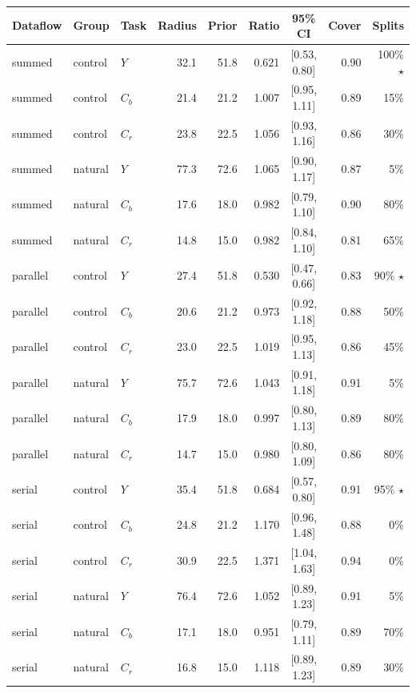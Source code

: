 \begin{tabular}{lllrrrcrr}
\hline
Dataflow & Group & Task & Radius & Prior & Ratio & 95\% CI & Cover & Splits \\
\hline
summed & control & $Y$ & 32.1 & 51.8 & 0.621 & [0.53, 0.80] & 0.90 & 100\% $\star$ \\
summed & control & $C_b$ & 21.4 & 21.2 & 1.007 & [0.95, 1.11] & 0.89 & 15\%  \\
summed & control & $C_r$ & 23.8 & 22.5 & 1.056 & [0.93, 1.16] & 0.86 & 30\%  \\
summed & natural & $Y$ & 77.3 & 72.6 & 1.065 & [0.90, 1.17] & 0.87 & 5\%  \\
summed & natural & $C_b$ & 17.6 & 18.0 & 0.982 & [0.79, 1.10] & 0.90 & 80\%  \\
summed & natural & $C_r$ & 14.8 & 15.0 & 0.982 & [0.84, 1.10] & 0.81 & 65\%  \\
\hline
parallel & control & $Y$ & 27.4 & 51.8 & 0.530 & [0.47, 0.66] & 0.83 & 90\% $\star$ \\
parallel & control & $C_b$ & 20.6 & 21.2 & 0.973 & [0.92, 1.18] & 0.88 & 50\%  \\
parallel & control & $C_r$ & 23.0 & 22.5 & 1.019 & [0.95, 1.13] & 0.86 & 45\%  \\
parallel & natural & $Y$ & 75.7 & 72.6 & 1.043 & [0.91, 1.18] & 0.91 & 5\%  \\
parallel & natural & $C_b$ & 17.9 & 18.0 & 0.997 & [0.80, 1.13] & 0.89 & 80\%  \\
parallel & natural & $C_r$ & 14.7 & 15.0 & 0.980 & [0.80, 1.09] & 0.86 & 80\%  \\
\hline
serial & control & $Y$ & 35.4 & 51.8 & 0.684 & [0.57, 0.80] & 0.91 & 95\% $\star$ \\
serial & control & $C_b$ & 24.8 & 21.2 & 1.170 & [0.96, 1.48] & 0.88 & 0\%  \\
serial & control & $C_r$ & 30.9 & 22.5 & 1.371 & [1.04, 1.63] & 0.94 & 0\%  \\
serial & natural & $Y$ & 76.4 & 72.6 & 1.052 & [0.89, 1.23] & 0.91 & 5\%  \\
serial & natural & $C_b$ & 17.1 & 18.0 & 0.951 & [0.79, 1.11] & 0.89 & 70\%  \\
serial & natural & $C_r$ & 16.8 & 15.0 & 1.118 & [0.89, 1.23] & 0.89 & 30\%  \\
\hline
\end{tabular}
